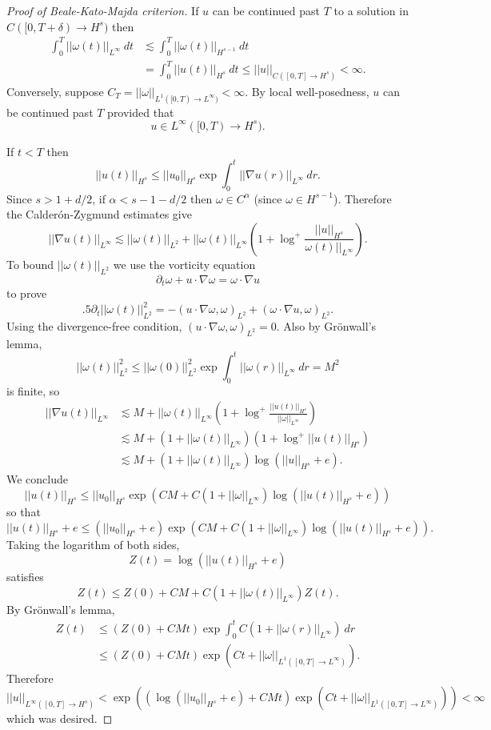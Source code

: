 \documentclass[12pt]{book}
\theoremstyle{definition}
\begin{document}
\begin{proof}[Proof of Beale-Kato-Majda criterion]
If $u$ can be continued past $T$ to a solution in $C([0, T + \delta) \to H^s)$ then
\begin{align*}
\int_0^T ||\omega(t)||_{L^\infty} ~dt &\lesssim \int_0^T ||\omega(t)||_{H^{s-1}} ~dt\\
& = \int_0^T ||u(t)||_{H^s} ~dt \leq ||u||_{C([0, T] \to H^s)} < \infty.
\end{align*}
Conversely, suppose $C_T = ||\omega||_{L^1([0, T) \to L^\infty)} < \infty$.
By local well-posedness, $u$ can be continued past $T$ provided that
$$u \in L^\infty([0, T) \to H^s).$$

If $t < T$ then
$$||u(t)||_{H^s} \leq ||u_0||_{H^s} \exp \int_0^t ||\nabla u(r)||_{L^\infty} ~dr.$$
Since $s > 1 + d/2$, if $\alpha < s - 1 - d/2$ then $\omega \in C^\alpha$ (since $\omega \in H^{s-1}$).
Therefore the Calder\'on-Zygmund estimates give
$$||\nabla u(t)||_{L^\infty} \lesssim ||\omega(t)||_{L^2} + ||\omega(t)||_{L^\infty}(1 + \log^+ \frac{||u||_{H^s}}{\omega(t)||_{L^\infty}}).$$
To bound $||\omega(t)||_{L^2}$ we use the vorticity equation
$$\partial_t \omega + u \cdot \nabla \omega = \omega \cdot \nabla u$$
to prove
$$.5 \partial_t ||\omega(t)||_{L^2}^2 = -(u \cdot \nabla \omega, \omega)_{L^2} + (\omega \cdot \nabla u, \omega)_{L^2}.$$
Using the divergence-free condition, $(u \cdot \nabla \omega, \omega)_{L^2} = 0$.
Also by Gr\"onwall's lemma,
$$||\omega(t)||_{L^2}^2 \leq ||\omega(0)||_{L^2}^2 \exp \int_0^t ||\omega(r)||_{L^\infty} ~dr = M^2$$
is finite, so
\begin{align*}
||\nabla u(t)||_{L^\infty} &\lesssim M + ||\omega(t)||_{L^\infty}(1 + \log^+ \frac{||u(t)||_{H^s}}{||\omega||_{L^\infty}})\\
&\lesssim M + (1 + ||\omega(t)||_{L^\infty})(1 + \log^+ ||u(t)||_{H^s})\\
&\lesssim M + (1 + ||\omega(t)||_{L^\infty}) \log(||u||_{H^s} + e).
\end{align*}
We conclude
$$||u(t)||_{H^s} \leq ||u_0||_{H^s} \exp(CM + C(1 + ||\omega||_{L^\infty})\log (||u(t)||_{H^s} + e))$$
so that
$$||u(t)||_{H^s} + e \leq (||u_0||_{H^s} + e)\exp(CM + C(1 + ||\omega||_{L^\infty})\log(||u(t)||_{H^s} + e)).$$
Taking the logarithm of both sides,
$$Z(t) = \log(||u(t)||_{H^s} + e)$$
satisfies
$$Z(t) \leq Z(0) + CM + C(1 + ||\omega(t)||_{L^\infty})Z(t).$$
By Gr\"onwall's lemma,
\begin{align*}Z(t) &\leq (Z(0) + CMt)\exp \int_0^t C(1 + ||\omega(r)||_{L^\infty}) ~dr\\
&\leq (Z(0) + CMt) \exp(Ct + ||\omega||_{L^1([0, T] \to L^\infty)}).
\end{align*}
Therefore
$$||u||_{L^\infty([0, T] \to H^s)} < \exp( (\log(||u_0||_{H^s} + e) + CMt) \exp(Ct + ||\omega||_{L^1([0, T] \to L^\infty)})) < \infty$$
which was desired.
\end{proof}
\end{document}

